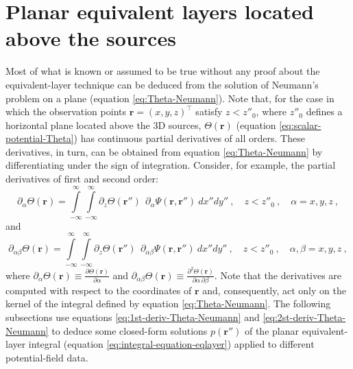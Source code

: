 \section{Planar equivalent layers located above the sources}
\label{sec:eqlayers_above_sources}


Most of what is known or assumed to be true without any proof about the
equivalent-layer technique can be deduced from the solution of Neumann's 
problem on a plane (equation \ref{eq:Theta-Neumann}).
Note that, for the case in which the observation points 
$\mathbf{r} = (x, y, z)^{\top}$ satisfy $z < z''_{0}$, where $z''_{0}$ defines a 
horizontal plane located above the 3D sources, $\Theta(\mathbf{r})$ (equation 
\ref{eq:scalar-potential-Theta}) has continuous partial derivatives of all orders. 
These derivatives, in turn, can be obtained from equation \ref{eq:Theta-Neumann} 
by differentiating under the sign of integration.
Consider, for example, the partial derivatives of first and second order:
\begin{equation}
	\partial_{\alpha} \Theta(\mathbf{r}) =  
	\int\limits_{-\infty}^{\infty} \int\limits_{-\infty}^{\infty}
	\partial_{z} \Theta(\mathbf{r}'') \:\: 
	\partial_{\alpha} \Psi(\mathbf{r}, \mathbf{r}'') \: dx''dy'' \: , 
	\quad z < z''_{0} \: ,
	\quad \alpha = x, y, z \: ,
	\label{eq:1st-deriv-Theta-Neumann}
\end{equation}
and
\begin{equation}
	\partial_{\alpha\beta} \Theta(\mathbf{r}) =  
	\int\limits_{-\infty}^{\infty} \int\limits_{-\infty}^{\infty}
	\partial_{z} \Theta(\mathbf{r}'') \:\: 
	\partial_{\alpha\beta} \Psi(\mathbf{r}, \mathbf{r}'') \: dx''dy'' \: , 
	\quad z < z''_{0} \: ,
	\quad \alpha, \beta = x, y, z \: ,
	\label{eq:2st-deriv-Theta-Neumann}
\end{equation}
where $\partial_{\alpha} \Theta(\mathbf{r}) \equiv \tfrac{\partial
\Theta(\mathbf{r})}{\partial \alpha}$ and 
$\partial_{\alpha\beta} \Theta(\mathbf{r}) \equiv \tfrac{\partial^{2}
\Theta(\mathbf{r})}{\partial \alpha \, \partial \beta}$.
Note that the derivatives are computed with respect to the coordinates
of $\mathbf{r}$ and, consequently, act only on the kernel of the integral 
defined by equation \ref{eq:Theta-Neumann}.
The following subsections use equations \ref{eq:1st-deriv-Theta-Neumann} and
\ref{eq:2st-deriv-Theta-Neumann} to deduce some closed-form solutions $p(\mathbf{r}'')$ of 
the planar equivalent-layer integral (equation \ref{eq:integral-equation-eqlayer}) 
applied to different potential-field data.

